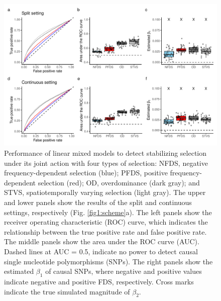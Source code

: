 \documentclass[12pt,]{article}
\begin{document}
\begin{figure}[]
  \includegraphics[width=\linewidth]{beta1LMMdomi.pdf}
  \caption{Performance of linear mixed models to detect stabilizing selection under its joint action with four types of selection: NFDS, negative frequency-dependent selection (blue); PFDS, positive frequency-dependent selection (red); OD, overdominance (dark gray); and STVS, spatiotemporally varying selection (light gray). The upper and lower panels show the results of the split and continuous settings, respectively (Fig. \ref{fig1:scheme}a). The left panels show the receiver operating characteristic (ROC) curve, which indicates the relationship between the true positive rate and false positive rate. The middle panels show the area under the ROC curve (AUC). Dashed lines at AUC = 0.5, indicate no power to detect causal single nucleotide polymorphisms (SNPs). The right panels show the estimated $\beta_1$ of causal SNPs, where negative and positive values indicate negative and positive FDS, respectively. Cross marks indicate the true simulated magnitude of $\beta_2$.}
  \label{figS6:beta1LMM}
\end{figure}
\end{document}
